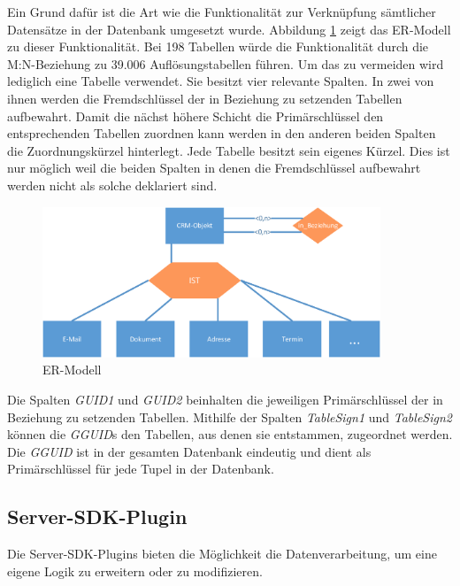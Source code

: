 Ein Grund dafür ist die Art wie die Funktionalität zur Verknüpfung sämtlicher Datensätze in der Datenbank umgesetzt wurde. Abbildung \ref{gw_2} zeigt das ER-Modell zu dieser Funktionalität. Bei 198 Tabellen würde die Funktionalität durch die M:N-Beziehung zu 39.006 Auflösungstabellen führen. Um das zu vermeiden wird lediglich eine Tabelle verwendet. Sie besitzt vier relevante Spalten. In zwei von ihnen werden die Fremdschlüssel der in Beziehung zu setzenden Tabellen aufbewahrt. Damit die nächst höhere Schicht die Primärschlüssel den entsprechenden Tabellen zuordnen kann werden in den anderen beiden Spalten die Zuordnungskürzel hinterlegt. Jede Tabelle besitzt sein eigenes Kürzel. Dies ist nur möglich weil die beiden Spalten in denen die Fremdschlüssel aufbewahrt werden nicht als solche deklariert sind.

\begin{figure}[ht]
	\centering
  \includegraphics[width=0.9\textwidth, width=0.9\textwidth]{pics/erm.pdf}
	\caption{ER-Modell}
	\label{gw_2}
\end{figure}

Die Spalten \textit{GUID1} und \textit{GUID2} beinhalten die jeweiligen Primärschlüssel der in Beziehung zu setzenden Tabellen. Mithilfe der Spalten \textit{TableSign1} und \textit{TableSign2} können die \textit{GGUID}s den Tabellen, aus denen sie entstammen, zugeordnet werden. Die \textit{GGUID} ist in der gesamten Datenbank eindeutig und dient als Primärschlüssel für jede Tupel in der Datenbank.

\subsection{Server-SDK-Plugin}
\label{ch:Systemanalyse:sec:genesisWorld:subsec:plugin}

Die Server-SDK-Plugins bieten die Möglichkeit die Datenverarbeitung, um eine eigene Logik zu erweitern oder zu modifizieren. 

